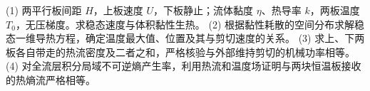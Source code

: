 (1) 两平行板间距 \(H\)，上板速度 \(U\)，下板静止；流体黏度 \(\eta\)、热导率 \(k\)，两板温度 \(T_0\)，无压梯度。求稳态速度与体积黏性生热。
(2) 根据黏性耗散的空间分布求解稳态一维导热方程，确定温度最大值、位置及其与剪切速度的关系。
(3) 求上、下两板各自带走的热流密度及二者之和，严格核验与外部维持剪切的机械功率相等。
(4) 对全流层积分局域不可逆熵产生率，利用热流和温度场证明与两块恒温板接收的热熵流严格相等。
